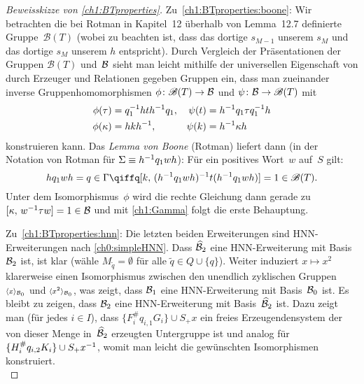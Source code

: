 \begin{proof}[Beweisskizze von \cref{ch1:BTproperties}]
    Zu~\ref{ch1:BTproperties:boone}: Wir betrachten die bei Rotman 
    in Kapitel~12 überhalb von Lemma~12.7 definierte Gruppe~$\mathscr{B}(T)$
    (wobei zu beachten ist, dass das dortige $s_{M-1}$ unserem $s_M$
    und das dortige $s_M$ unserem $h$ entspricht).
    Durch Vergleich der Präsentationen der Gruppen $\mathscr{B}(T)$
    und~$\mathcal{B}$ sieht man leicht mithilfe der universellen Eigenschaft
    von durch Erzeuger und Relationen gegeben Gruppen ein, dass man
    zueinander inverse Gruppenhomomorphismen $\phi\colon\mathscr{B}(T)
    \to\mathcal{B}$ und $\psi\colon\mathcal{B}\to\mathscr{B}(T)$ mit
    \begin{align*}
        \phi(\tau)   &= q_1^{-1} hth^{-1} q_1
        ,&
        \psi(t)      &= h^{-1} q_1\tau q_1^{-1} h
        \\
        \phi(\kappa) &= hkh^{-1}
        ,&
        \psi(k)      &= h^{-1}\kappa h
    \end{align*}
    konstruieren kann. Das \emph{Lemma von Boone}
    (Rotman\cite[Lemma~12.7]{bookc:rotman95}) liefert dann
    (in der Notation von Rotman für $\Sigma \equiv h^{-1} q_1wh$):
    Für ein positives Wort~$w$ auf~$S$ gilt:
    \[ hq_1wh = q \in\Gamma
        \qiffq
        \cu[k, (h\inv q_1wh)\inv t (h\inv q_1wh)] = 1
        \in\mathscr{B}(T)
    . \]
    Unter dem Isomorphismus~$\phi$ wird die rechte Gleichung
    dann gerade zu $\cu[\kappa, w\inv\tau w] = 1 \in\BT$
    und mit \cref{ch1:Gamma} folgt die erste Behauptung.
    
    Zu~\ref{ch1:BTproperties:hnn}: Die letzten beiden Erweiterungen
    sind HNN-Erweiterungen nach \cref{ch0:simpleHNN}. Dass $\widehat{\mathcal{B}}_2$
    eine HNN-Erweiterung mit Basis~$\mathcal{B}_2$ ist, ist klar (wähle
    $M_{\tilde q} = \emptyset$ für alle $\tilde q\in Q\cup\{q\}$).
    Weiter induziert $x\mapsto x^2$ klarerweise einen Isomorphismus
    zwischen den unendlich zyklischen Gruppen $\scriptstyle\langle x\rangle_{\mathcal{B}_0}$
    und $\scriptstyle\langle x^2\rangle_{\mathcal{B}_0}$, was zeigt, dass $\mathcal{B}_1$ eine
    HNN-Erweiterung mit Basis~$\mathcal{B}_0$ ist. Es bleibt zu zeigen,
    dass $\mathcal{B}_2$ eine HNN-Erweiterung mit Basis~$\widehat{\mathcal{B}}_2$ ist.
    Dazu zeigt man (für jedes $i\in I$), dass $\{F_i^\#q_{i,1}G_i\}\cup
    S_+x$ ein freies Erzeugendensystem der von dieser Menge
    in~$\widehat{\mathcal{B}}_2$ erzeugten Untergruppe ist und analog für
    $\{H_i^\#q_{i,2}K_i\}\cup S_+x^{-1}$, womit man leicht die
    gewünschten Isomorphismen konstruiert. 
    \\
\end{proof}

